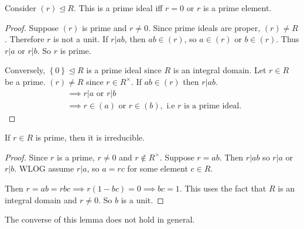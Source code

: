 \documentclass[egregdoesnotlikesansseriftitles,a4paper]{scrartcl}
\begin{document}
\begin{lemma}
       Consider $(r)\unlhd R$. This is a prime ideal iff $r=0$ or $r$ is a prime element.
       \begin{proof}
            Suppose $(r)$ is prime and $r \neq 0$. Since prime ideals are proper, $(r) \neq R$. Therefore $r$ is not a unit. If $r|ab$, then $ab \in (r)$, so $a \in (r)$ or $b \in (r)$. Thus $r|a$ or $r|b$. So $r $ is prime.
     
            Conversely, $\left\{0\right\}\unlhd R$ is a prime ideal since $R$ is an integral domain. Let $r \in R$ be a prime. $(r)\neq R$ since $r \in R^{\times }$. If $ab \in (r)$ then $r|ab$. 
            \begin{align*}
                  &\implies r|a \text{ or } r|b\\
                  &\implies r \in (a) \text{ or } r \in (b), \text{ i.e } r \text{ is a prime ideal. }
            \end{align*}
     \end{proof}
\end{lemma}
\begin{lemma}
       If $r \in R$ is prime, then it is irreducible.
\end{lemma}
\begin{proof}
       Since $r$ is a prime, $r \neq 0$ and $r \notin R^{\times}$. Suppose $r=ab$. Then $r|ab$ so $r|a$ or $r|b$. WLOG assume $r|a$, so $a=rc $ for some element $c \in R$.

       Then $r=ab=rbc \implies r (1-bc)=0 \implies bc=1$. This uses the fact that $R$ is an integral domain and $r \neq 0$. So $b$ is a unit.
\end{proof}
The converse of this lemma does not hold in general.
\end{document}

